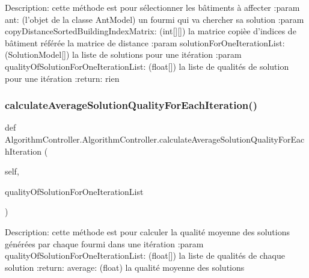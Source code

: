 \begin{DoxyVerb}Description: cette méthode est pour sélectionner les bâtiments à affecter
:param ant: (l'objet de la classe AntModel) un fourmi qui va chercher sa solution
:param copyDistanceSortedBuildingIndexMatrix: (int[][]) la matrice copièe d'indices de bâtiment référée la matrice de distance
:param solutionForOneIterationList: (SolutionModel[]) la liste de solutions pour une itération
:param qualityOfSolutionForOneIterationList: (float[]) la liste de qualités de solution pour une itération
:return: rien
\end{DoxyVerb}
 \mbox{\label{class_algorithm_controller_1_1_algorithm_controller_a6b570c9ebad1e6a937e74490fab6a8a9}} 
\subsubsection{\texorpdfstring{calculate\+Average\+Solution\+Quality\+For\+Each\+Iteration()}{calculateAverageSolutionQualityForEachIteration()}}
{\footnotesize\ttfamily def Algorithm\+Controller.\+Algorithm\+Controller.\+calculate\+Average\+Solution\+Quality\+For\+Each\+Iteration (\begin{DoxyParamCaption}\item[{}]{self,  }\item[{}]{quality\+Of\+Solution\+For\+One\+Iteration\+List }\end{DoxyParamCaption})}

\begin{DoxyVerb}Description: cette méthode est pour calculer la qualité moyenne des solutions générées par chaque fourmi dans une itération
:param qualityOfSolutionForOneIterationList: (float[]) la liste de qualités de chaque solution
:return: average: (float) la qualité moyenne des solutions
\end{DoxyVerb}
 \mbox{\label{class_algorithm_controller_1_1_algorithm_controller_a3e4df24f596b73789fe10ef001dc4fd7}} 
